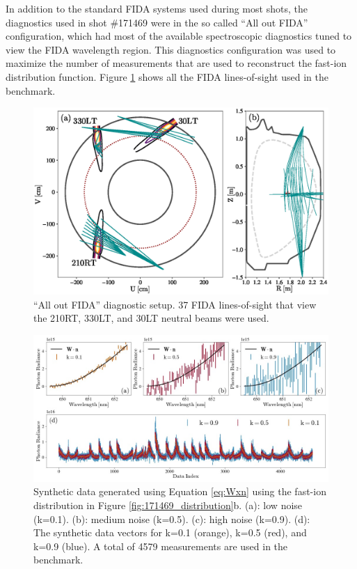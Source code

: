 In addition to the standard FIDA systems used during most shots, the diagnostics used in shot \#171469 were in the so called ``All out FIDA'' configuration, which had most of the available spectroscopic diagnostics tuned to view the FIDA wavelength region.
This diagnostics configuration was used to maximize the number of measurements that are used to reconstruct the fast-ion distribution function.
Figure \ref{fig:d3d_chords} shows all the FIDA lines-of-sight used in the benchmark.
\begin{figure}[h!]
    \centering
    \includegraphics[width=16cm]{figures/d3d_chords.eps}
    \caption{``All out FIDA'' diagnostic setup. 37 FIDA lines-of-sight that view the 210RT, 330LT, and 30LT neutral beams were used.}
    \label{fig:d3d_chords}
\end{figure}
\begin{figure}[h!]
    \centering
    \includegraphics[width=16cm]{figures/synthetic_data.jpg}
    \caption{Synthetic data generated using Equation \ref{eq:Wxn} using the fast-ion distribution in Figure \ref{fig:171469_distribution}b. (a): low noise (k=0.1). (b): medium noise (k=0.5). (c): high noise (k=0.9). (d): The synthetic data vectors for k=0.1 (orange), k=0.5 (red), and k=0.9 (blue). A total of 4579 measurements are used in the benchmark.}
    \label{fig:synthetic_data}
\end{figure}

